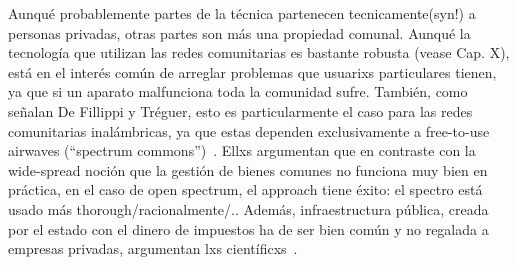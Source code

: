 Aunqué probablemente partes de la técnica partenecen tecnicamente(syn!) a personas privadas, otras partes son más una propiedad comunal.
Aunqué la tecnología que utilizan las redes comunitarias es bastante robusta (vease Cap. X), está en el interés común de arreglar problemas que usuarixs particulares tienen, ya que si un aparato malfunciona toda la comunidad sufre.
También, como señalan De Fillippi y Tréguer, esto es particularmente el caso para las redes comunitarias inalámbricas, ya que estas dependen exclusivamente a free-to-use airwaves (``spectrum commons'')~\autocite{FiTre2015}.
Ellxs argumentan que en contraste con la wide-spread noción que la gestión de bienes comunes no funciona muy bien en práctica, en el caso de open spectrum, el approach tiene éxito:
el spectro está usado más thorough/racionalmente/..
Además, infraestructura pública, creada por el estado con el dinero de impuestos ha de ser bien común y no regalada a empresas privadas, argumentan lxs científicxs~\autocite{FiTre2015}.

